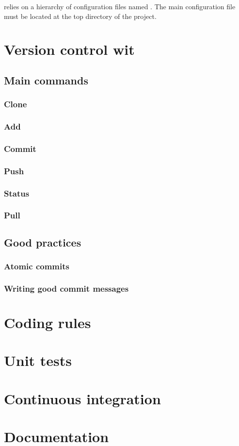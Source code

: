 \CMake relies on a hierarchy of configuration files named \CMakeLists. The main configuration file must be located at the top directory of the project.







\section{Version control wit \Git}


\subsection{Main commands}


\subsubsection{Clone}

\subsubsection{Add}

\subsubsection{Commit}


\subsubsection{Push}


\subsubsection{Status}


\subsubsection{Pull}


\subsection{Good practices}


\subsubsection{Atomic commits}

\subsubsection{Writing good commit messages}



\section{Coding rules}
\section{Unit tests}
\section{Continuous integration}
\section{Documentation}